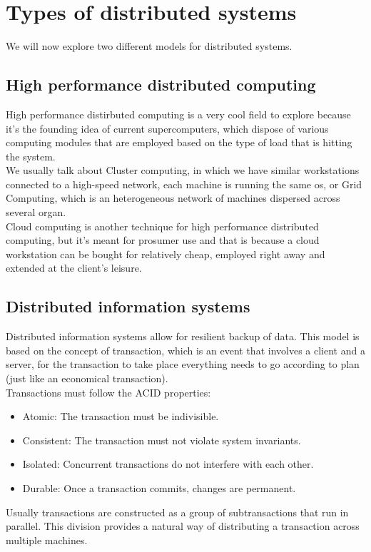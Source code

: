 \section{Types of distributed systems}
We will now explore two different models for distributed systems.
\subsection{High performance distributed computing}
High performance distirbuted computing is a very cool field to explore because it's the founding idea of current supercomputers, which dispose of various computing modules that are employed based on the type of load that is hitting the system. \\
We usually talk about Cluster computing, in which we have similar workstations connected to a high-speed network, each machine is running the same os, or Grid Computing, which is an heterogeneous network of machines dispersed across several organ. \\
Cloud computing is another technique for high performance distributed computing, but it's meant for prosumer use and that is because a cloud workstation can be bought for relatively cheap, employed right away and extended at the client's leisure.
\subsection{Distributed information systems}
Distributed information systems allow for resilient backup of data. This model is based on the concept of transaction, which is an event that involves a client and a server, for the transaction to take place everything needs to go according to plan (just like an economical transaction). \\
Transactions must follow the ACID properties:
\begin{itemize}
    \item Atomic: The transaction must be indivisible.
    \item Consistent: The transaction must not violate system invariants.
    \item Isolated: Concurrent transactions do not interfere with each other.
    \item Durable: Once a transaction commits, changes are permanent.
\end{itemize}
Usually transactions are constructed as a group of subtransactions that run in parallel. This division provides a natural way of distributing a transaction across multiple machines.
